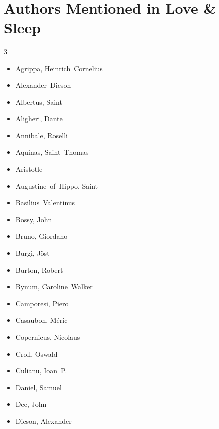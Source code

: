 \documentclass[10pt,makeidx]{extreport}
\newcommand\fleuron{\begin{turn}{45}\Large \ding{166}\end{turn}}
\newcommand\doublefleuron{%
	\reflectbox{\fleuron}\AC\staveXLIX\reflectbox{\AC}\fleuron}
\newcommand\fleuronbar{%
	{\huge\LinearACCCXIII}\xrfill[1.3ex]{1pt}\doublefleuron\xrfill[1.3ex]{1pt}\reflectbox{\huge\LinearACCCXIII}}
\newcommand\nbvspace[1][3]{\vspace*{\stretch{#1}}}
\begin{document}
\bigskip
\begin{center}
\vfill
\shadowoffset{1pt}
\shadowtext{%
{\color{Mahogany}\fontsize{60}{64}\Venus}}\\
\nbvspace[1]
\end{center}


\pagebreak
\section{Authors Mentioned in Love \& Sleep}

\begin{multicols}{3}
\begin{itemize}
  \item Agrippa, Heinrich~Cornelius
  \item Alexander~Dicson
  \item Albertus, Saint
  \item Aligheri, Dante
  \item Annibale, Roselli
  \item Aquinas, Saint~Thomas
  \item Aristotle
  \item Augustine~of~Hippo, Saint
  \item Basilius~Valentinus
  \item Bossy, John
  \item Bruno, Giordano
  \item Burgi, Jöst
  \item Burton, Robert
  \item Bynum, Caroline~Walker
  \item Camporesi, Piero
  \item Casaubon, Méric
  \item Copernicus, Nicolaus
  \item Croll, Oswald
  \item Culianu, Ioan~P.
  \item Daniel, Samuel
  \item Dee, John
  \item Dicson, Alexander

\end{itemize}
\end{multicols}
\end{document}
